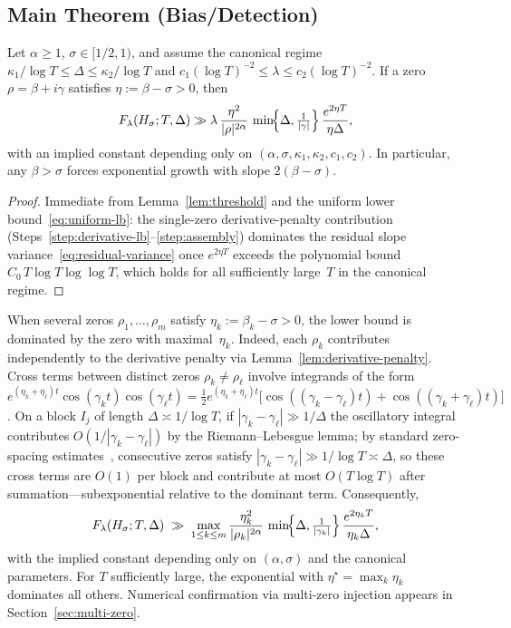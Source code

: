 \subsection{Main Theorem (Bias/Detection)}\label{subsec:bias-theorem}

\begin{theorem}\label{thm:bias}
Let $\alpha\ge1$, $\sigma\in[1/2,1)$, and assume the canonical regime
$\kappa_1/\log T \le \Delta \le \kappa_2/\log T$ and
$c_1(\log T)^{-2}\le \lambda \le c_2(\log T)^{-2}$.
If a zero $\rho=\beta+i\gamma$ satisfies $\eta:=\beta-\sigma>0$, then
\[
F_\lambda(H_\sigma;T,\Delta)
   \gg \lambda\,
       \frac{\eta^{2}}{|\rho|^{2\alpha}}\,
       \min\!\Bigl\{\Delta,\tfrac{1}{|\gamma|}\Bigr\}\,
       \frac{e^{2\eta T}}{\eta\Delta},
\]
with an implied constant depending only on
$(\alpha,\sigma,\kappa_1,\kappa_2,c_1,c_2)$.
In particular, any $\beta>\sigma$ forces exponential growth with slope $2(\beta-\sigma)$.
\end{theorem}

\begin{proof}
Immediate from Lemma~\ref{lem:threshold} and the uniform lower
bound~\eqref{eq:uniform-lb}: the single-zero derivative-penalty contribution
(Steps~\ref{step:derivative-lb}--\ref{step:assembly}) dominates the residual
slope variance~\eqref{eq:residual-variance} once $e^{2\eta T}$ exceeds the
polynomial bound $C_0\,T\log T\log\log T$, which holds for all sufficiently
large~$T$ in the canonical regime.
\end{proof}

\begin{remark}\label{rmk:multiple-zeros}
When several zeros $\rho_1,\ldots,\rho_m$ satisfy $\eta_k:=\beta_k-\sigma>0$,
the lower bound is dominated by the zero with maximal~$\eta_k$.
Indeed, each $\rho_k$ contributes independently to the derivative penalty
via Lemma~\ref{lem:derivative-penalty}.  Cross terms between distinct zeros
$\rho_k\ne\rho_\ell$ involve integrands of the form
$e^{(\eta_k+\eta_\ell)t}\cos(\gamma_k t)\cos(\gamma_\ell t)
=\tfrac12 e^{(\eta_k+\eta_\ell)t}
\bigl[\cos((\gamma_k-\gamma_\ell)t)+\cos((\gamma_k+\gamma_\ell)t)\bigr]$.
On a block $I_j$ of length $\Delta\asymp 1/\log T$, if $|\gamma_k-\gamma_\ell|\gg 1/\Delta$
the oscillatory integral contributes $O(1/|\gamma_k-\gamma_\ell|)$
by the Riemann--Lebesgue lemma;
by standard zero-spacing estimates~\cite{montgomery-pair}, consecutive zeros satisfy
$|\gamma_k-\gamma_\ell|\gg 1/\log T\asymp\Delta$,
so these cross terms are $O(1)$ per block and contribute at most $O(T\log T)$
after summation---subexponential relative to the dominant term.
Consequently,
\[
F_\lambda(H_\sigma;T,\Delta)
\;\gg\;
\max_{1\le k\le m}
\frac{\eta_k^{2}}{|\rho_k|^{2\alpha}}\,
\min\!\Bigl\{\Delta,\tfrac{1}{|\gamma_k|}\Bigr\}\,
\frac{e^{2\eta_k T}}{\eta_k\Delta},
\]
with the implied constant depending only on $(\alpha,\sigma)$ and the
canonical parameters.  For $T$ sufficiently large, the exponential with
$\eta^{\star}=\max_k\eta_k$ dominates all others.
Numerical confirmation via multi-zero injection appears in
Section~\ref{sec:multi-zero}.
\end{remark}

